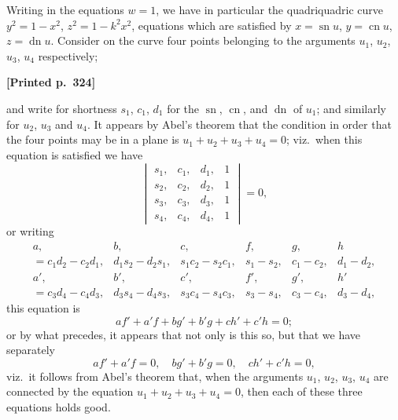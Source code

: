 \documentclass[11pt]{article}
\begin{document}
\medskip

Writing in the equations $w = 1$, we have in particular the quadriquadric curve $y^{2} = 1 - x^{2}$, $z^{2} = 1 - k^{2}x^{2}$, equations which are satisfied by $x = \operatorname{sn} u$, $y = \operatorname{cn} u$, $z = \operatorname{dn} u$. Consider on the curve four points belonging to the arguments $u_{1}$, $u_{2}$, $u_{3}$, $u_{4}$ respectively;

\medskip

\noindent\textbf{[Printed p.~324]}\hfill

and write for shortness $s_{1}$, $c_{1}$, $d_{1}$ for the $\operatorname{sn}$, $\operatorname{cn}$, and $\operatorname{dn}$ of $u_{1}$; and similarly for $u_{2}$, $u_{3}$ and $u_{4}$. It appears by Abel's theorem that the condition in order that the four points may be in a plane is $u_{1} + u_{2} + u_{3} + u_{4} = 0$; viz.\ when this equation is satisfied we have
\[
\begin{vmatrix}
s_{1}, & c_{1}, & d_{1}, & 1 \\
s_{2}, & c_{2}, & d_{2}, & 1 \\
s_{3}, & c_{3}, & d_{3}, & 1 \\
s_{4}, & c_{4}, & d_{4}, & 1
\end{vmatrix} = 0,
\]
or writing
\[
\begin{array}{cccccc}
a, & b, & c, & f, & g, & h \\
= c_{1}d_{2} - c_{2}d_{1}, & d_{1}s_{2} - d_{2}s_{1}, & s_{1}c_{2} - s_{2}c_{1}, & s_{1} - s_{2}, & c_{1} - c_{2}, & d_{1} - d_{2}, \\[2pt]
a', & b', & c', & f', & g', & h' \\
= c_{3}d_{4} - c_{4}d_{3}, & d_{3}s_{4} - d_{4}s_{3}, & s_{3}c_{4} - s_{4}c_{3}, & s_{3} - s_{4}, & c_{3} - c_{4}, & d_{3} - d_{4},
\end{array}
\]
this equation is
\[
af' + a'f + bg' + b'g + ch' + c'h = 0;
\]
or by what precedes, it appears that not only is this so, but that we have separately
\[
af' + a'f = 0,\quad bg' + b'g = 0,\quad ch' + c'h = 0,
\]
viz.\ it follows from Abel's theorem that, when the arguments $u_{1}$, $u_{2}$, $u_{3}$, $u_{4}$ are connected by the equation $u_{1} + u_{2} + u_{3} + u_{4} = 0$, then each of these three equations holds good.

\medskip
\end{document}
